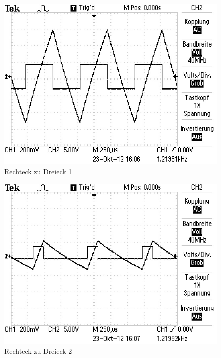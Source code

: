 \begin{figure}[H]
\includegraphics[height=0.4\textheight] {_pics/rechteck2.JPG}
\centering
\caption{Rechteck zu Dreieck 1}
\end{figure}

\begin{figure}[H]
\includegraphics[height=0.4\textheight] {_pics/rechteck1.JPG}
\centering
\caption {Rechteck zu Dreieck 2}
\end{figure}

